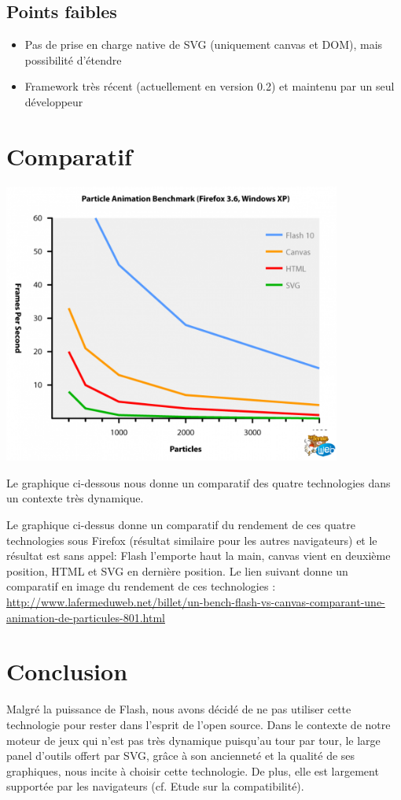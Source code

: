 \documentclass[a4paper,10pt]{report}
\begin{document}
\subsection{Points faibles}

\begin{itemize}
 \item Pas de prise en charge native de SVG (uniquement canvas et DOM), mais possibilité d'étendre
 \item Framework très récent (actuellement en version 0.2) et maintenu par un seul développeur
\end{itemize}


\section{Comparatif}

  \includegraphics[width=420px]{img/bench.png}

  Le graphique ci-dessous nous donne un comparatif des quatre technologies dans 
un contexte très dynamique.
 
Le graphique ci-dessus donne un comparatif du rendement de ces quatre technologies sous 
Firefox (résultat similaire pour les autres navigateurs) et le résultat est sans appel: 
Flash l'emporte haut la main, canvas vient en deuxième position, HTML et SVG en dernière 
position. Le lien suivant donne un comparatif en image du rendement de ces technologies : \url{http://www.lafermeduweb.net/billet/un-bench-flash-vs-canvas-comparant-une-animation-de-particules-801.html}

\section{Conclusion}
Malgré la puissance de Flash, nous avons décidé de ne pas utiliser cette 
technologie pour rester dans l'esprit de l'open source.
Dans le contexte de notre moteur de jeux qui n'est pas très dynamique puisqu'au tour par tour, le large panel 
d'outils offert par SVG, grâce à son ancienneté et la qualité de ses graphiques,
 nous incite à choisir cette technologie. De plus, elle est largement supportée par les navigateurs
 (cf. Etude sur la compatibilité).
\end{document}
